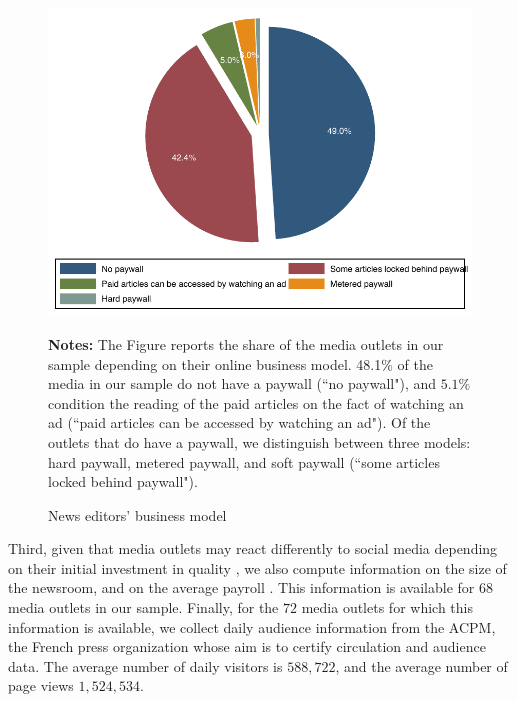 \begin{figure}
\begin{center}
\includegraphics[scale=1]{figures/paywall_final}
\end{center}
	\begin{spacing}{0.5}
		{\footnotesize \textbf{Notes:} The Figure reports the share of the media outlets in our sample depending on their online business model. 48.1\% of the media in our sample do not have a paywall (``no paywall"), and $5.1\%$ condition the reading of the paid articles on the fact of watching an ad (``paid articles can be accessed by watching an ad"). Of the outlets that do have a paywall, we distinguish between three models: hard paywall, metered paywall, and soft paywall (``some articles locked behind paywall").}
	\end{spacing}
\vspace{.5cm}	
	\caption{News editors' business model}
	\label{fig:paywall_final}
\end{figure}


Third, given that media outlets may react differently to social media depending on their initial investment in quality \citep[see e.g.][]{deCorniereSarvary2019}, we also compute information on the size of the newsroom, and on the average payroll \citep{Cage2015_journalists}. This information is available for $68$ media outlets in our sample. Finally, for the $72$ media outlets for which this information is available, we collect daily audience information from the ACPM, the French press organization whose aim is to certify circulation and audience data. The average number of daily visitors is $588,722$, and the average number of page views $1,524,534$.


